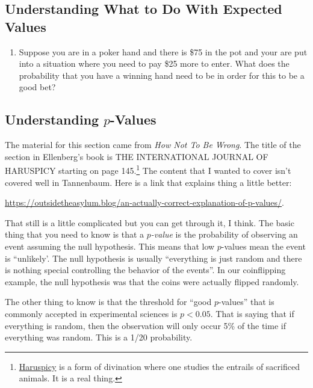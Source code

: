\documentclass[11pt, letterpaper]{article}
\begin{document}
\subsection{Understanding What to Do With Expected Values}
\begin{enumerate}
	\item Suppose you are in a poker hand and there is \$75 in the pot and your are put into a situation where you need to pay \$25 more to enter. 
	What does the probability that you have a winning hand need to be in order for this to be a good bet?	
\end{enumerate}

\subsection{Understanding $p$-Values}
The material for this section came from \emph{How Not To Be Wrong}. The title of the section in Ellenberg's book is THE INTERNATIONAL JOURNAL OF HARUSPICY starting on page 145.\footnote{ \href{https://en.wikipedia.org/wiki/Haruspex}{Haruspicy} is a form of divination where one studies the entrails of sacrificed animals. It is a real thing. }
The content that I wanted to cover isn't covered well in Tannenbaum. 
Here is a link that explains thing a little better:
\begin{center}
 \url{https://outsidetheasylum.blog/an-actually-correct-explanation-of-p-values/}. 
\end{center}
That still is a little complicated but you can get through it, I think.
The basic thing that you need to know is that a \emph{$p$-value} is the probability of observing an event assuming the null hypothesis. This means that low $p$-values mean the event is ``unlikely'. The null hypothesis is usually ``everything is just random and there is nothing special controlling the behavior of the events''. In our coinflipping example, the null hypothesis was that the coins were actually flipped randomly. 

The other thing to know is that the threshold for ``good $p$-values'' that is commonly accepted in experimental sciences is $p<0.05$. That is saying that if everything is random, then the observation will only occur 5\% of the time if everything was random. This is a 1/20 probability.
\end{document}
